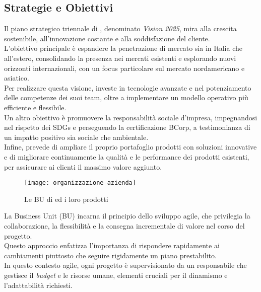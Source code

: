 \newpage

\subsection{Strategie e Obiettivi}
Il piano strategico triennale di \azienda, denominato \textit{Vision 2025}, mira alla crescita sostenibile, all'innovazione costante e alla soddisfazione del cliente. \\
L'obiettivo principale è espandere la penetrazione di mercato sia in Italia che all'estero, consolidando la presenza nei mercati esistenti e esplorando nuovi orizzonti internazionali, con un focus particolare sul mercato nordamericano e asiatico. \\
Per realizzare questa visione, \azienda investe in tecnologie avanzate e nel potenziamento delle competenze dei suoi team, oltre a implementare un modello operativo più efficiente e flessibile. \\
Un altro obiettivo è promuovere la responsabilità sociale d'impresa, impegnandosi nel rispetto dei \gls{SDGs} e perseguendo la certificazione \gls{BCorp}, a testimonianza di un impatto positivo sia sociale che ambientale. \\
Infine, \azienda prevede di ampliare il proprio portafoglio prodotti con soluzioni innovative e di migliorare continuamente la qualità e le performance dei prodotti esistenti, per assicurare ai clienti il massimo valore aggiunto.


\begin{figure}[!h] 
  \centering 
  \texttt{[image: organizzazione-azienda]} 
  \caption{Le BU di {\azienda} ed i loro prodotti}
  \label{fig:organizzazione-azienda}
\end{figure}

\noindent La Business Unit (BU) incarna il principio dello sviluppo agile, che privilegia la collaborazione, 
la flessibilità e la consegna incrementale di valore nel corso del progetto. 
\\Questo approccio enfatizza l'importanza di rispondere rapidamente ai cambiamenti piuttosto che seguire rigidamente un piano prestabilito. 
\\In questo contesto agile, ogni progetto è supervisionato da un responsabile che gestisce il \textit{budget} e le risorse umane,
 elementi cruciali per il dinamismo e l'adattabilità richiesti.

